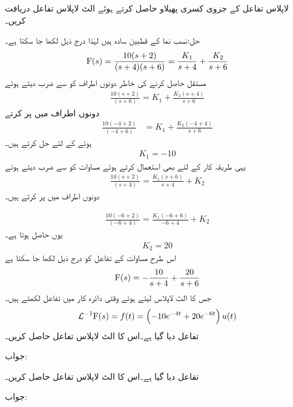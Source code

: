 لاپلاس تفاعل  کے جزوی کسری پھیلاو حاصل کرتے ہوئے الٹ لاپلاس تفاعل  دریافت کریں۔ 

حل:نسب نما کے قطبین سادہ ہیں لہٰذا درج ذیل لکھا جا سکتا ہے۔
\begin{align}\label{مساوات_لاپلاس_سادہ_قطبین_الف}
{\ensuremath{{\textup{F}}}}(s)=\frac{10(s+2)}{(s+4)(s+6)}=\frac{K_1}{s+4}+\frac{K_2}{s+6}
\end{align}
مستقل  حاصل کرنے کی خاطر دونوں اطراف کو  سے ضرب دیتے ہوئے
\begin{align*}
\frac{10(s+2)}{(s+6)}=K_1+\frac{K_2(s+4)}{s+6}
\end{align*}
دونوں اطراف میں  پر کرتے  
\begin{align*}
\frac{10(-4+2)}{(-4+6)}&=K_1+\frac{K_2(-4+4)}{s+6}
\end{align*}
ہوئے  کے لئے حل کرتے ہیں۔
\begin{align*}
K_1=-10
\end{align*}
یہی طریقہ کار  کے لئے بھی استعمال کرتے ہوئے مساوات  کو  سے ضرب دیتے ہوئے
\begin{align*}
\frac{10(s+2)}{(s+4)}=\frac{K_1(s+6)}{s+4}+K_2
\end{align*}
دونوں اطراف میں  پر کرتے ہیں۔

\begin{align*}
\frac{10(-6+2)}{(-6+4)}=\frac{K_1(-6+6)}{-6+4}+K_2
\end{align*}
یوں  حاصل ہوتا ہے۔
\begin{align*}
K_2=20
\end{align*}
اس طرح مساوات  کے تفاعل کو درج ذیل لکھا جا سکتا ہے
\begin{align*}
{\ensuremath{{\textup{F}}}}(s)=-\frac{10}{s+4}+\frac{20}{s+6}
\end{align*}
جس کا الٹ لاپلاس لیتے ہوئے وقتی دائرہ کار میں تفاعل لکھتے ہیں۔
\begin{align*}
\mathcal{L}^{-1} {{\textup{F}}}(s)=f(t)=\left(-10e^{-4t}+20e^{-6t}\right)u(t)
\end{align*}
تفاعل  دیا گیا ہے۔اس کا الٹ لاپلاس تفاعل حاصل کریں۔

جواب:

تفاعل  دیا گیا ہے۔اس کا الٹ لاپلاس تفاعل حاصل کریں۔

جواب:
